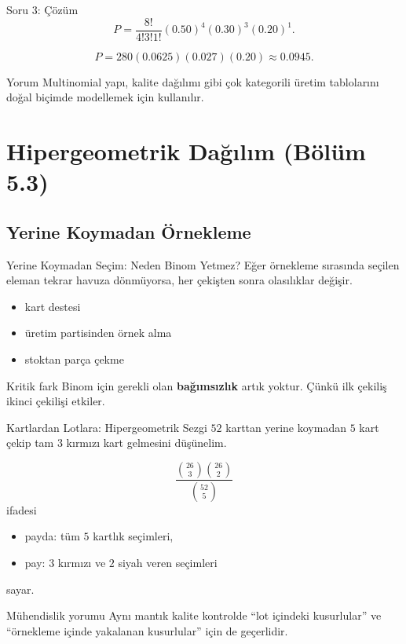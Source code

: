 \documentclass[light]{lutbeamer}
\begin{document}
\begin{frame}{Soru 3: Çözüm}
    \small
    \[
    P=\frac{8!}{4!3!1!}(0.50)^4(0.30)^3(0.20)^1.
    \]

    \[
    P=280(0.0625)(0.027)(0.20)\approx 0.0945.
    \]

    \begin{exampleblock}{Yorum}
        Multinomial yapı, kalite dağılımı gibi çok kategorili üretim tablolarını doğal biçimde modellemek için kullanılır.
    \end{exampleblock}
\end{frame}

\section{Hipergeometrik Dağılım (Bölüm 5.3)}
\subsection{Yerine Koymadan Örnekleme}

\begin{frame}{Yerine Koymadan Seçim: Neden Binom Yetmez?}
    \small
    Eğer örnekleme sırasında seçilen eleman tekrar havuza dönmüyorsa, her çekişten sonra olasılıklar değişir.

    \begin{itemize}
        \item kart destesi
        \item üretim partisinden örnek alma
        \item stoktan parça çekme
    \end{itemize}

    \begin{alertblock}{Kritik fark}
        Binom için gerekli olan \textbf{bağımsızlık} artık yoktur. Çünkü ilk çekiliş ikinci çekilişi etkiler.
    \end{alertblock}
\end{frame}

\begin{frame}{Kartlardan Lotlara: Hipergeometrik Sezgi}
    \small
    \(52\) karttan yerine koymadan \(5\) kart çekip tam \(3\) kırmızı kart gelmesini düşünelim.

    \[
    \frac{\binom{26}{3}\binom{26}{2}}{\binom{52}{5}}
    \]
    ifadesi
    \begin{itemize}
        \item payda: tüm \(5\) kartlık seçimleri,
        \item pay: \(3\) kırmızı ve \(2\) siyah veren seçimleri
    \end{itemize}
    sayar.

    \begin{exampleblock}{Mühendislik yorumu}
        Aynı mantık kalite kontrolde ``lot içindeki kusurlular'' ve ``örnekleme içinde yakalanan kusurlular'' için de geçerlidir.
    \end{exampleblock}
\end{frame}
\end{document}

